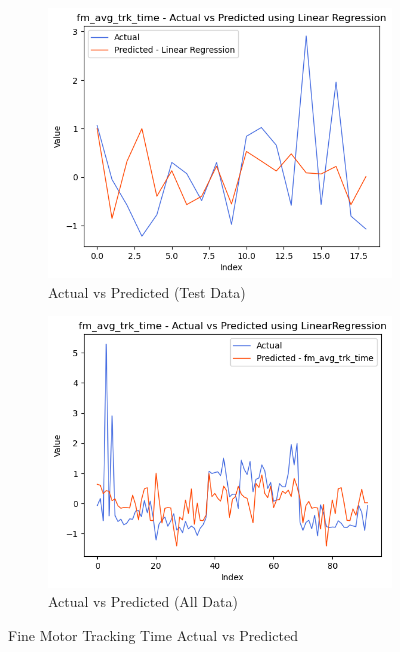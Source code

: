 \begin{figure}[htbp]
    \centering
    \begin{subfigure}[b]{0.49\textwidth}
        \centering
        \includegraphics[width=\textwidth]{images/charts/test_data_fine_motor_tracking_time.png}
        \caption{Actual vs Predicted (Test Data)}
        \label{fig:actual_vs_predicted_fm_avg_trk_time_test}
    \end{subfigure}\hfill
    \begin{subfigure}[b]{0.49\textwidth}
        \centering
        \includegraphics[width=\textwidth]{images/charts/all_data_fine_motor_tracking_time.png}
        \caption{Actual vs Predicted (All Data)}
        \label{fig:actual_vs_predicted_fm_avg_trk_time_all_data}
    \end{subfigure}
    \caption{Fine Motor Tracking Time Actual vs Predicted}
    \label{fig:fine_motor_tracking_time_comparison}
\end{figure}

